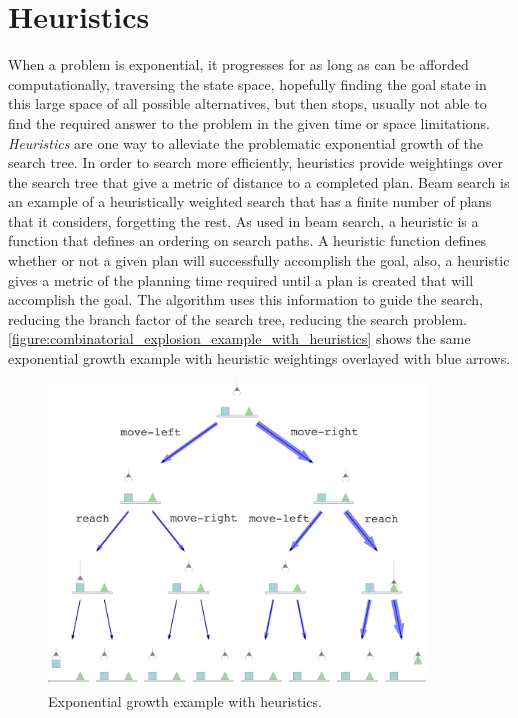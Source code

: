 \section{Heuristics}

When a problem is exponential, it progresses for as long as can be
afforded computationally, traversing the state space, hopefully
finding the goal state in this large space of all possible
alternatives, but then stops, usually not able to find the required
answer to the problem in the given time or space limitations.
\emph{Heuristics} are one way to alleviate the problematic exponential
growth of the search tree.  In order to search more efficiently,
heuristics provide weightings over the search tree that give a metric
of distance to a completed plan.  Beam search is an example of a
heuristically weighted search that has a finite number of plans that
it considers, forgetting the rest.  As used in beam search, a
heuristic is a function that defines an ordering on search paths.  A
heuristic function defines whether or not a given plan will
successfully accomplish the goal, also, a heuristic gives a metric of
the planning time required until a plan is created that will
accomplish the goal.  The algorithm uses this information to guide the
search, reducing the branch factor of the search tree, reducing the
search problem.
{\mbox{\autoref{figure:combinatorial_explosion_example_with_heuristics}}}
shows the same exponential growth example with heuristic weightings
overlayed with blue arrows.
\begin{figure}
\center
\includegraphics[width=10cm]{gfx/combinatorial_explosion_example_with_heuristics}
\caption{Exponential growth example with heuristics.}
\label{figure:combinatorial_explosion_example_with_heuristics}
\end{figure}

